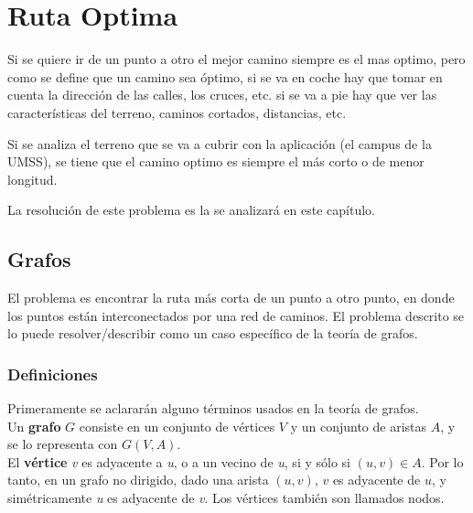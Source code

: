 \chapter{Ruta Optima} %
\label{cha:ruta_optima}
  

  Si se quiere ir de un punto a otro el mejor camino siempre es el mas optimo, pero como se define que un camino sea óptimo, si se va en coche hay que tomar en cuenta la dirección de las calles, los cruces, etc. si se va a pie hay que ver las características del terreno, caminos cortados, distancias, etc. 


  Si se analiza el terreno que se va a cubrir con la aplicación (el campus de la UMSS), se tiene que el  camino optimo es siempre el más corto o de menor longitud. 

  La resolución de este problema es la se analizará en este capítulo.

  \section{Grafos} %
  \label{sec:teoria_grafos}
  
    El problema es encontrar la ruta más corta de un punto a otro punto, en donde los puntos están interconectados por una red de caminos. El problema descrito se lo puede resolver/describir como un caso espec\'ifico de la teoría de grafos.


    \subsection{Definiciones} %
    \label{sub:grafos_definiciones}
      Primeramente se aclarar\'an alguno términos usados en la teoría de grafos.\\


      
      Un \textbf{grafo} $G$ consiste en un conjunto de vértices $V$ y un conjunto de aristas $A$, y se lo representa con $G(V,A)$.\\ 

      El \textbf{vértice} \emph{v} es adyacente a \emph{u}, o a un vecino de \emph{u}, si y sólo si $(u,v) \in A$. Por lo tanto, en un grafo no dirigido, dado una arista $(u,v)$, $v$ es adyacente de $u$, y simétricamente \emph{u} es adyacente de \emph{v}. 
      Los vértices también son llamados nodos. \\

